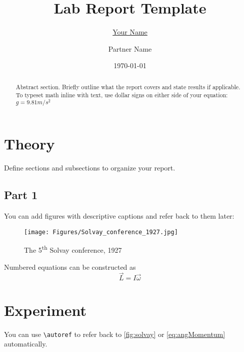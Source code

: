 \documentclass[11pt,oneside,letterpaper]{article} %
\title{Lab Report Template}
\author{\underline{Your Name} \and Partner Name}
\date{\today}
\begin{document}
\maketitle %


\begin{abstract} %
Abstract section. Briefly outline what the report covers and state results if applicable.
To typeset math inline with text, use dollar signs on either side of your equation: $g = 9.81m/s^2$
\end{abstract} 



\section{Theory}
Define sections and subsections to organize your report.


\subsection{Part 1}
You can add figures with descriptive captions and refer back to them later:


\begin{figure}[H] %
   \centering
   \texttt{[image: Figures/Solvay\_conference\_1927.jpg]} %
   \caption{The 5\textsuperscript{th} Solvay conference, 1927}
   \label{fig:solvay} %
\end{figure}


\par Numbered equations can be constructed as %
\begin{equation}
	\vec{L} = I \vec{\omega} \label{eq:angMomentum} %
\end{equation}


\section{Experiment}
You can use \verb|\autoref| to refer back to \autoref{fig:solvay} or \autoref{eq:angMomentum} automatically.
\end{document}
